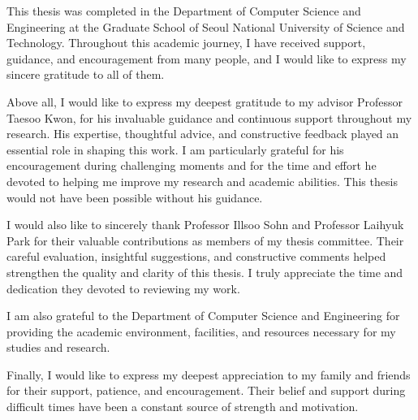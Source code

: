 \begin{KoreanAcknowledgement}
This thesis was completed in the Department of Computer Science and Engineering at the Graduate School of Seoul National University of Science and Technology. Throughout this academic journey, I have received support, guidance, and encouragement from many people, and I would like to express my sincere gratitude to all of them.

Above all, I would like to express my deepest gratitude to my advisor Professor Taesoo Kwon, for his invaluable guidance and continuous support throughout my research. His expertise, thoughtful advice, and constructive feedback played an essential role in shaping this work. I am particularly grateful for his encouragement during challenging moments and for the time and effort he devoted to helping me improve my research and academic abilities. This thesis would not have been possible without his guidance.

I would also like to sincerely thank Professor Illsoo Sohn and Professor Laihyuk Park for their valuable contributions as members of my thesis committee. Their careful evaluation, insightful suggestions, and constructive comments helped strengthen the quality and clarity of this thesis. I truly appreciate the time and dedication they devoted to reviewing my work.

I am also grateful to the Department of Computer Science and Engineering for providing the academic environment, facilities, and resources necessary for my studies and research.

Finally, I would like to express my deepest appreciation to my family and friends for their support, patience, and encouragement. Their belief and support during difficult times have been a constant source of strength and motivation.

\end{KoreanAcknowledgement}
